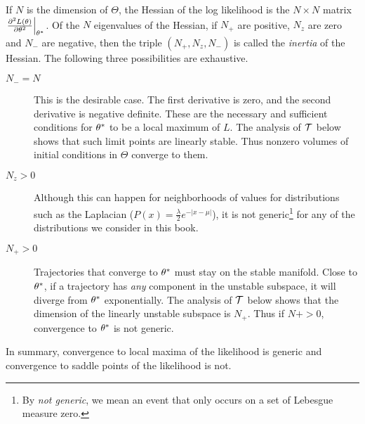 If $N$ is the dimension of $\Theta$, the Hessian of the log likelihood
is the $N\times N$ matrix $\left. \frac{\partial^2 L(\theta) }{
    \partial \theta^2 }\right|_{\theta^*}$.  Of the $N$
eigenvalues of the Hessian, if $N_+$ are positive, $N_z$ are zero and
$N_-$ are negative, then the triple $(N_+,N_z,N_-)$ is called the
\emph{inertia} of the Hessian.  The following three possibilities are
exhaustive.
\begin{description}
\item[$N_- = N$] This is the desirable case.  The first derivative
  is zero, and the second derivative is negative definite.  These
  are the necessary and sufficient conditions for $\theta^*$ to
  be a local maximum of $L$.  The analysis of $\EMmap$ below shows
  that such limit points are linearly stable.  Thus nonzero volumes
  of initial conditions in $\Theta$ converge to them.
\item[$N_z >0$] Although this can happen for neighborhoods of values
  for distributions such as the Laplacian ($P(x) = \frac{\lambda}{2}
  e^{-\left|x-\mu\right|}$), it is not generic\footnote{By \emph{not
      generic}, we mean an event that only occurs on a set of
    Lebesgue measure zero.} for any of the distributions we consider
  in this book.
\item[$N_+ >0$] Trajectories that converge to $\theta^*$ must
  stay on the stable manifold.  Close to $\theta^*$, if a
  trajectory has \emph{any} component in the unstable subspace, it
  will diverge from $\theta^*$ exponentially.  The analysis of
  $\EMmap$ below shows that the dimension of the linearly unstable
  subspace is $N_+$.  Thus if $N+ >0$, convergence to
  $\theta^*$ is not generic.
\end{description}
In summary, convergence to local maxima of the likelihood is generic
and convergence to saddle points of the likelihood is not.

